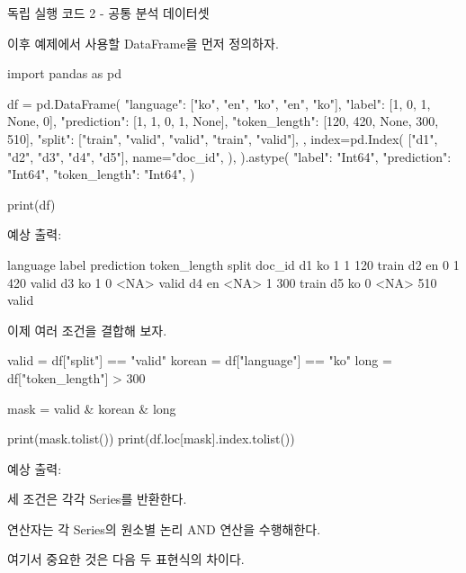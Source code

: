 \begin{dhknote}
\begin{dhksmry}[centered]
독립 실행 코드 2 - 공통 분석 데이터셋
\end{dhksmry}
\end{dhknote}

이후 예제에서 사용할 DataFrame을 먼저 정의하자.

\begin{dhkcode}
import pandas as pd

df = pd.DataFrame(
    {
        "language": ["ko", "en", "ko", "en", "ko"],
        "label": [1, 0, 1, None, 0],
        "prediction": [1, 1, 0, 1, None],
        "token_length": [120, 420, None, 300, 510],
        "split": ["train", "valid", "valid", "train", "valid"],
    },
    index=pd.Index(
        ["d1", "d2", "d3", "d4", "d5"],
        name="doc_id",
    ),
).astype({
    "label": "Int64",
    "prediction": "Int64",
    "token_length": "Int64",
})

print(df)
\end{dhkcode}

예상 출력:

\begin{dhkzsh}
       language  label  prediction  token_length  split
doc_id
d1           ko      1           1           120  train
d2           en      0           1           420  valid
d3           ko      1           0          <NA>  valid
d4           en   <NA>           1           300  train
d5           ko      0        <NA>           510  valid
\end{dhkzsh}

이제 여러 조건을 결합해 보자.

\begin{dhkcode}
valid = df["split"] == "valid"
korean = df["language"] == "ko"
long = df["token_length"] > 300

mask = valid & korean & long

print(mask.tolist())
print(df.loc[mask].index.tolist())
\end{dhkcode}

예상 출력:

\begin{dhkzsh}
\end{dhkzsh}

세 조건은 각각 Series를 반환한다.

\zsh{&} 연산자는 각 Series의 원소별 논리 AND 연산을 수행해한다.

여기서 중요한 것은 다음 두 표현식의 차이다.

